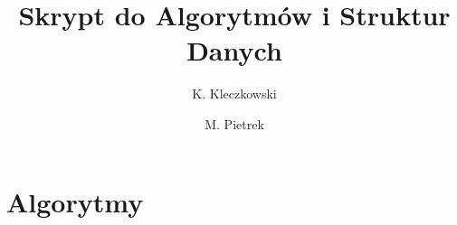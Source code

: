 \documentclass{book}
\title{Skrypt do Algorytmów i Struktur Danych}
\author{
    K. Kleczkowski
    \and M. Pietrek   
}
\begin{document}
    \maketitle
    \tableofcontents

    \part{Algorytmy}

    
\end{document}
